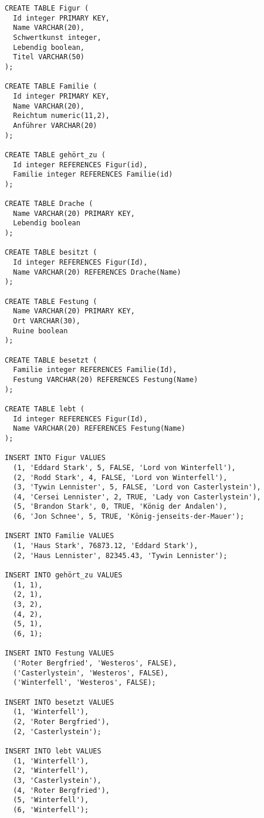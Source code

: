 \documentclass{bschlangaul-aufgabe}
\begin{document}
\begin{verbatim}
CREATE TABLE Figur (
  Id integer PRIMARY KEY,
  Name VARCHAR(20),
  Schwertkunst integer,
  Lebendig boolean,
  Titel VARCHAR(50)
);

CREATE TABLE Familie (
  Id integer PRIMARY KEY,
  Name VARCHAR(20),
  Reichtum numeric(11,2),
  Anführer VARCHAR(20)
);

CREATE TABLE gehört_zu (
  Id integer REFERENCES Figur(id),
  Familie integer REFERENCES Familie(id)
);

CREATE TABLE Drache (
  Name VARCHAR(20) PRIMARY KEY,
  Lebendig boolean
);

CREATE TABLE besitzt (
  Id integer REFERENCES Figur(Id),
  Name VARCHAR(20) REFERENCES Drache(Name)
);

CREATE TABLE Festung (
  Name VARCHAR(20) PRIMARY KEY,
  Ort VARCHAR(30),
  Ruine boolean
);

CREATE TABLE besetzt (
  Familie integer REFERENCES Familie(Id),
  Festung VARCHAR(20) REFERENCES Festung(Name)
);

CREATE TABLE lebt (
  Id integer REFERENCES Figur(Id),
  Name VARCHAR(20) REFERENCES Festung(Name)
);

INSERT INTO Figur VALUES
  (1, 'Eddard Stark', 5, FALSE, 'Lord von Winterfell'),
  (2, 'Rodd Stark', 4, FALSE, 'Lord von Winterfell'),
  (3, 'Tywin Lennister', 5, FALSE, 'Lord von Casterlystein'),
  (4, 'Cersei Lennister', 2, TRUE, 'Lady von Casterlystein'),
  (5, 'Brandon Stark', 0, TRUE, 'König der Andalen'),
  (6, 'Jon Schnee', 5, TRUE, 'König-jenseits-der-Mauer');

INSERT INTO Familie VALUES
  (1, 'Haus Stark', 76873.12, 'Eddard Stark'),
  (2, 'Haus Lennister', 82345.43, 'Tywin Lennister');

INSERT INTO gehört_zu VALUES
  (1, 1),
  (2, 1),
  (3, 2),
  (4, 2),
  (5, 1),
  (6, 1);

INSERT INTO Festung VALUES
  ('Roter Bergfried', 'Westeros', FALSE),
  ('Casterlystein', 'Westeros', FALSE),
  ('Winterfell', 'Westeros', FALSE);

INSERT INTO besetzt VALUES
  (1, 'Winterfell'),
  (2, 'Roter Bergfried'),
  (2, 'Casterlystein');

INSERT INTO lebt VALUES
  (1, 'Winterfell'),
  (2, 'Winterfell'),
  (3, 'Casterlystein'),
  (4, 'Roter Bergfried'),
  (5, 'Winterfell'),
  (6, 'Winterfell');
\end{verbatim}
\end{document}
